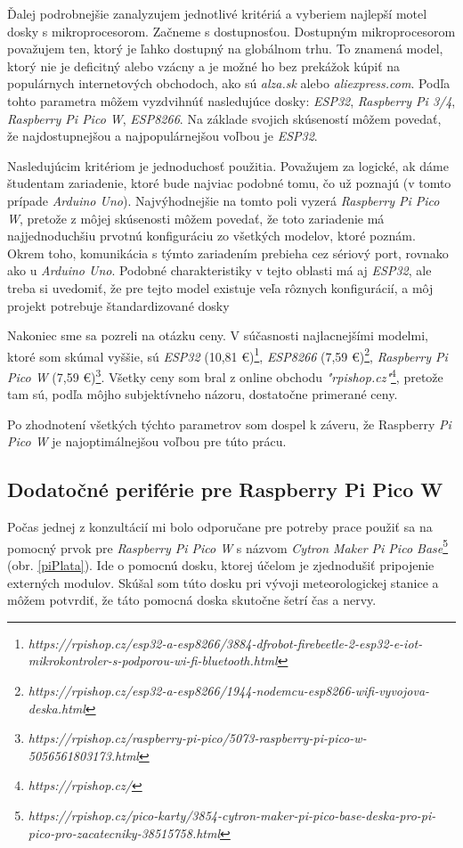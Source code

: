Ďalej podrobnejšie zanalyzujem jednotlivé kritériá a vyberiem najlepší motel dosky s mikroprocesorom. Začneme s dostupnosťou. Dostupným mikroprocesorom považujem ten, ktorý je ľahko dostupný na globálnom trhu. To znamená model, ktorý nie je deficitný alebo vzácny a je možné ho bez prekážok kúpiť na populárnych internetových obchodoch, ako sú \textit{alza.sk} alebo \textit{aliexpress.com}. Podľa tohto parametra môžem vyzdvihnúť nasledujúce dosky: \textit{ESP32}, \textit{Raspberry Pi 3/4}, \textit{Raspberry Pi Pico W}, \textit{ESP8266}. Na základe svojich skúseností môžem povedať, že najdostupnejšou a najpopulárnejšou voľbou je \textit{ESP32}.

Nasledujúcim kritériom je jednoduchosť použitia. Považujem za logické, ak dáme študentam zariadenie, ktoré bude najviac podobné tomu, čo už poznajú (v tomto prípade \textit{Arduino Uno}). Najvýhodnejšie na tomto poli vyzerá \textit{Raspberry Pi Pico W}, pretože z môjej skúsenosti môžem povedať, že toto zariadenie má najjednoduchšiu prvotnú konfiguráciu zo všetkých modelov, ktoré poznám. Okrem toho, komunikácia s týmto zariadením prebieha cez sériový port, rovnako ako u \textit{Arduino Uno}. Podobné charakteristiky v tejto oblasti má aj \textit{ESP32}, ale treba si uvedomiť, že pre tejto model existuje veľa rôznych konfigurácií, a môj projekt potrebuje štandardizované dosky

Nakoniec sme sa pozreli na otázku ceny. V súčasnosti najlacnejšími modelmi, ktoré som skúmal vyššie, sú \textit{ESP32} (10,81 €)\footnote{\textit{https://rpishop.cz/esp32-a-esp8266/3884-dfrobot-firebeetle-2-esp32-e-iot-mikrokontroler-s-podporou-wi-fi-bluetooth.html}}, \textit{ESP8266} (7,59 €)\footnote{\textit{https://rpishop.cz/esp32-a-esp8266/1944-nodemcu-esp8266-wifi-vyvojova-deska.html}}, \textit{Raspberry Pi Pico W} (7,59 €)\footnote{\textit{https://rpishop.cz/raspberry-pi-pico/5073-raspberry-pi-pico-w-5056561803173.html}}. Všetky ceny som bral z online obchodu \textit{"rpishop.cz"}\footnote{\textit{https://rpishop.cz/}}, pretože tam sú, podľa môjho subjektívneho názoru, dostatočne primerané ceny.

Po zhodnotení všetkých týchto parametrov som dospel k záveru, že Raspberry \textit{Pi Pico W} je najoptimálnejšou voľbou pre túto prácu.


\subsection{Dodatočné periférie pre Raspberry Pi Pico W}
Počas jednej z konzultácií mi bolo odporučane pre potreby prace použiť sa na pomocný prvok pre \textit{Raspberry Pi Pico W} s názvom \textit{Cytron Maker Pi Pico Base}\footnote{\textit{https://rpishop.cz/pico-karty/3854-cytron-maker-pi-pico-base-deska-pro-pi-pico-pro-zacatecniky-38515758.html}} (obr. \ref{piPlata}). Ide o pomocnú dosku, ktorej účelom je zjednodušiť pripojenie externých modulov. Skúšal som túto dosku pri vývoji meteorologickej stanice a môžem potvrdiť, že táto pomocná doska skutočne šetrí čas a nervy.

